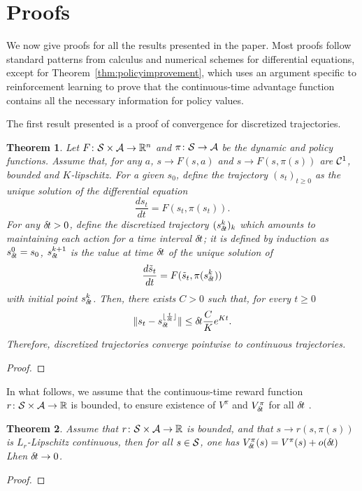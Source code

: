 \documentclass[11pt]{article}
\newtheorem{theorem}{Theorem}
\begin{document}
\section{Proofs}

We now give proofs for all the results presented in the paper. Most
proofs follow standard patterns from calculus and numerical schemes for
differential equations, except for Theorem~\ref{thm:policyimprovement},
which uses an argument specific to reinforcement learning to prove that
the continuous-time advantage function contains all the necessary
information for policy values.


The first result presented is a proof of convergence for discretized
trajectories.
\begin{theorem}
	Let $F\colon {\cal S} \times {\cal A} \rightarrow \mathbb{R}^n$ and $\pi\colon {\cal S}
	\rightarrow {\cal A}$ be the dynamic and policy functions. Assume that,
	for any $a$, $s \rightarrow F(s, a)$ and $s \rightarrow F(s, \pi(s))$
	are ${\cal C}^1$, bounded and $K$-lipschitz.  For
	a given $s_0$, define the trajectory $(s_t)_{t\geq 0}$ as the unique
	solution of the differential equation
	\begin{equation}
		\frac{ds_t}{dt} = F(s_t, \pi(s_t)).
		\label{eq:diff}
	\end{equation}
	For any ${\delta\hspace{-.1em}t} > 0$, define the discretized trajectory
	$(s_{\delta\hspace{-.1em}t}^k)_k$ which amounts to maintaining each action for a
	time interval ${\delta\hspace{-.1em}t}$; it is defined by induction as $s_{\delta\hspace{-.1em}t}^0 = s_0$,
	$s_{\delta\hspace{-.1em}t}^{k + 1}$ is the value at time ${\delta\hspace{-.1em}t}$ of
	the unique solution of
	\begin{equation}
		\frac{d\tilde{s}_t}{dt} = F(\tilde{s}_t, \pi(s_{\delta\hspace{-.1em}t}^k))
		\label{eq:diff_2}
	\end{equation}
	with initial point $s_{\delta\hspace{-.1em}t}^k$.
	Then, there exists $C > 0$ such that, for every $t \geq 0$
	\begin{equation}
		\|s_t - s_{\delta\hspace{-.1em}t}^{\lfloor \frac{t}{{\delta\hspace{-.1em}t}} \rfloor}\|
		\leq {\delta\hspace{-.1em}t} \frac{C}{K}e^{Kt}.
	\end{equation}
	Therefore, discretized trajectories converge pointwise to continuous trajectories.
	\label{th:traj-conv}
\end{theorem}
\begin{proof}
	
\end{proof}

In what follows, we assume that the continuous-time reward function $r\colon {\cal S} \times {\cal A} \rightarrow \mathbb{R}$
is bounded, to ensure existence of $V^\pi$ and $V^\pi_{\delta\hspace{-.1em}t}$ for all ${\delta\hspace{-.1em}t}$
.\begin{theorem}
	Assume that $r\colon {\cal S} \times {\cal A} \rightarrow \mathbb{R}$ is bounded, and
	that $s \rightarrow r(s, \pi(s))$ is $L_r$-Lipschitz continuous, then
	for all $s \in {\cal S}$, one has
	$V^\pi_{\delta\hspace{-.1em}t}(s) = V^\pi(s) + o({\delta\hspace{-.1em}t})$
	Lhen ${\delta\hspace{-.1em}t}\to 0$.
	\label{th:conv-value}
\end{theorem}
\begin{proof}
	
\end{proof}
\end{document}
